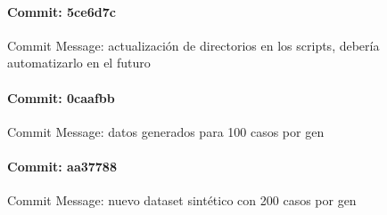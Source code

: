 \documentclass{article}
\begin{document}
\paragraph{Commit: 5ce6d7c}
Commit Message: actualización de directorios en los scripts, debería automatizarlo en el futuro

\paragraph{Commit: 0caafbb}
Commit Message: datos generados para 100 casos por gen

\paragraph{Commit: aa37788}
Commit Message: nuevo dataset sintético con 200 casos por gen

\end{document}
